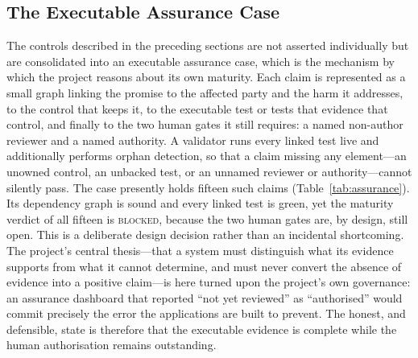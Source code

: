 
\subsection{The Executable Assurance Case}
\label{sec:assurance}
The controls described in the preceding sections are not asserted individually but are consolidated
into an executable assurance case, which is the mechanism by which the project reasons about its own
maturity. Each claim is represented as a small graph linking the promise to the affected party and the
harm it addresses, to the control that keeps it, to the executable test or tests that evidence that
control, and finally to the two human gates it still requires: a named non-author reviewer and a named
authority. A validator runs every linked test live and additionally performs orphan detection, so that
a claim missing any element---an unowned control, an unbacked test, or an unnamed reviewer or
authority---cannot silently pass. The case presently holds fifteen such claims (Table~\ref{tab:assurance}).
Its dependency graph is sound and every linked test is green, yet the maturity verdict of all fifteen is
\textsc{blocked}, because the two human gates are, by design, still open. This is a deliberate design
decision rather than an incidental shortcoming. The project's central thesis---that a system must
distinguish what its evidence supports from what it cannot determine, and must never convert the absence
of evidence into a positive claim---is here turned upon the project's own governance: an assurance
dashboard that reported ``not yet reviewed'' as ``authorised'' would commit precisely the error the
applications are built to prevent. The honest, and defensible, state is therefore that the executable
evidence is complete while the human authorisation remains outstanding.

